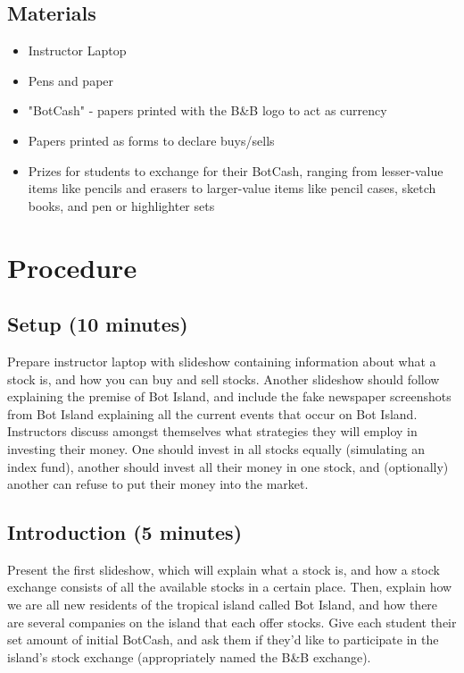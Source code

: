 \documentclass{lessonplan}
\begin{document}
    \subsection{Materials}
      \begin{itemize}
        \item Instructor Laptop 
        \item Pens and paper 
        \item "BotCash" - papers printed with the B\&B logo to act as currency
        \item Papers printed as forms to declare buys/sells
        \item Prizes for students to exchange for their BotCash, ranging from lesser-value items like pencils and erasers to larger-value items
                 like pencil cases, sketch books, and pen or highlighter sets
      \end{itemize}
  \section{Procedure}
    \subsection{Setup (10 minutes)}
     Prepare instructor laptop with slideshow containing information about what a stock is, and how you can buy and sell stocks.
     Another slideshow should follow explaining the premise of Bot Island, and include the fake newspaper screenshots from 
     Bot Island explaining all the current events that occur on Bot Island. Instructors discuss amongst themselves what
     strategies they will employ in investing their money. One should invest in all stocks equally (simulating an index fund),
     another should invest all their money in one stock, and (optionally) another can refuse to put their money into the market.
    \subsection{Introduction (5 minutes)}
     Present the first slideshow, which will explain what a stock is, and how a stock exchange consists of all the available stocks
     in a certain place. Then, explain how we are all new residents of the tropical island called Bot Island, and how there
     are several companies on the island that each offer stocks. Give each student their set amount of initial BotCash,
     and ask them if they'd like to participate in the island's stock exchange (appropriately named the B\&B exchange). 
\end{document}
